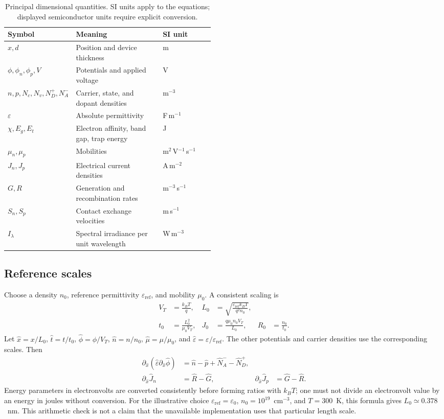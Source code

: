 \documentclass[11pt,a4paper]{article}
\numberwithin{equation}{section}
\begin{document}
\begin{table}[tbp]
\centering\small
\caption{Principal dimensional quantities. SI units apply to the
equations; displayed semiconductor units require explicit conversion.}
\begin{tabularx}{\linewidth}{@{}p{0.22\linewidth}Xp{0.25\linewidth}@{}}
\toprule
Symbol & Meaning & SI unit \\
\midrule
$x,d$ & Position and device thickness & m \\
$\phi,\phi_n,\phi_p,V$ & Potentials and applied voltage & V \\
$n,p,N_c,N_v,N_D^+,N_A^-$ & Carrier, state, and dopant densities & m$^{-3}$ \\
$\varepsilon$ & Absolute permittivity & F\,m$^{-1}$ \\
$\chi,E_g,E_t$ & Electron affinity, band gap, trap energy & J \\
$\mu_n,\mu_p$ & Mobilities & m$^2$\,V$^{-1}$\,s$^{-1}$ \\
$J_n,J_p$ & Electrical current densities & A\,m$^{-2}$ \\
$G,R$ & Generation and recombination rates & m$^{-3}$\,s$^{-1}$ \\
$S_n,S_p$ & Contact exchange velocities & m\,s$^{-1}$ \\
$I_\lambda$ & Spectral irradiance per unit wavelength & W\,m$^{-3}$ \\
\bottomrule
\end{tabularx}
\end{table}

\subsection{Reference scales}
Choose a density $n_0$, reference permittivity $\varepsilon_{\mathrm{ref}}$,
and mobility $\mu_0$. A consistent scaling is
\begin{align}
V_T&=\frac{k_BT}{q},&
L_0&=\sqrt{\frac{\varepsilon_{\mathrm{ref}}k_BT}{q^2n_0}},\\
t_0&=\frac{L_0^2}{\mu_0V_T},&
J_0&=\frac{q\mu_0n_0V_T}{L_0},&
R_0&=\frac{n_0}{t_0}.
\end{align}
Let $\hat x=x/L_0$, $\hat t=t/t_0$, $\hat\phi=\phi/V_T$,
$\hat n=n/n_0$, $\hat\mu=\mu/\mu_0$, and
$\hat\varepsilon=\varepsilon/\varepsilon_{\mathrm{ref}}$.
The other potentials and carrier densities use the corresponding scales.
Then
\begin{align}
\partial_{\hat x}(\hat\varepsilon\partial_{\hat x}\hat\phi)
 &=\hat n-\hat p+\hat N_A^- -\hat N_D^+,\\
\partial_{\hat x}\hat J_n&=\hat R-\hat G,&
\partial_{\hat x}\hat J_p&=\hat G-\hat R.
\end{align}
Energy parameters in electronvolts are converted consistently before
forming ratios with $k_BT$; one must not divide an electronvolt value by
an energy in joules without conversion. For the illustrative choice
$\varepsilon_{\mathrm{ref}}=\varepsilon_0$,
$n_0=10^{19}$~cm$^{-3}$, and $T=300$~K, this formula gives
$L_0\simeq0.378$~nm. This arithmetic check is not a claim that the
unavailable implementation uses that particular length scale.
\end{document}
